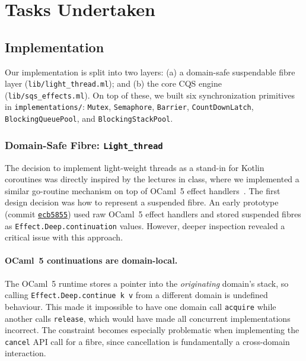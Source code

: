 \documentclass[11pt,a4paper]{article}
\newcommand{\commit}[1]{%
  \href{https://github.com/durwasa-chakraborty/CS6868_Concurrent_Programming_Project/commit/#1}%
       {\texttt{#1}}}
\begin{document}
\section{Tasks Undertaken}
\label{sec:tasks}

\subsection{Implementation}
\label{sec:tasks-impl}

Our implementation is split into two layers:
(a) a domain-safe suspendable fibre layer
(\texttt{lib/light\_thread.ml}); and
(b) the core CQS engine (\texttt{lib/sqs\_effects.ml}).
On top of these, we built six synchronization primitives in
\texttt{implementations/}: \texttt{Mutex}, \texttt{Semaphore},
\texttt{Barrier}, \texttt{CountDownLatch}, \texttt{BlockingQueuePool},
and \texttt{BlockingStackPool}.

\subsubsection{Domain-Safe Fibre: \texttt{Light\_thread}}
\label{sec:impl-light-thread}

The decision to implement light-weight threads as a stand-in for Kotlin
coroutines was directly inspired by the lectures in class, where we
implemented a similar go-routine mechanism on top of OCaml~5
effect handlers~\cite{kcsrk2020}. The first design decision was how to
represent a suspended fibre. An early prototype (commit
\commit{ecb5855}) used raw OCaml~5 effect handlers and stored suspended
fibres as \texttt{Effect.Deep.continuation} values. However, deeper
inspection revealed a critical issue with this approach.

\paragraph{OCaml~5 continuations are domain-local.}
The OCaml~5 runtime stores a pointer into the \emph{originating}
domain's stack, so calling \texttt{Effect.Deep.continue~k~v} from a
different domain is undefined behaviour. This made it impossible to
have one domain call \texttt{acquire} while another calls
\texttt{release}, which would have made all concurrent implementations
incorrect. The constraint becomes especially problematic when
implementing the \texttt{cancel} API call for a fibre, since
cancellation is fundamentally a cross-domain interaction.
\end{document}
